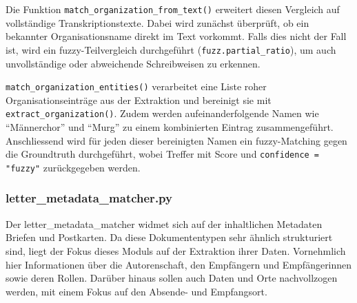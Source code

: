 \documentclass[12pt, a4paper, ngerman, bidi=default]{article}
\newcommand{\code}[1]{\colorbox{VeryLightGray}{\texttt{#1}}} %
\begin{document}
Die Funktion \code{match\_organization\_from\_text()} erweitert diesen Vergleich auf vollständige Transkriptionstexte. Dabei wird zunächst überprüft, ob ein bekannter Organisationsname direkt im Text vorkommt. Falls dies nicht der Fall ist, wird ein fuzzy-Teilvergleich durchgeführt (\code{fuzz.partial\_ratio}), um auch unvollständige oder abweichende Schreibweisen zu erkennen.

\code{match\_organization\_entities()} verarbeitet eine Liste roher Organisationseinträge aus der Extraktion und bereinigt sie mit \code{extract\_organization()}. Zudem werden aufeinanderfolgende Namen wie \enquote{Männerchor} und \enquote{Murg} zu einem kombinierten Eintrag zusammengeführt. Anschliessend wird für jeden dieser bereinigten Namen ein fuzzy-Matching gegen die Groundtruth durchgeführt, wobei Treffer mit Score und \code{confidence = "fuzzy"} zurückgegeben werden.

\subsubsection{letter\_metadata\_matcher.py}\label{subsection:letter_metadata_matcher}

Der letter\_metadata\_matcher widmet sich auf der inhaltlichen Metadaten Briefen und Postkarten. Da diese Dokumententypen sehr ähnlich strukturiert sind, liegt der Fokus dieses Moduls auf der Extraktion ihrer Daten. Vornehmlich hier Informationen über die Autorenschaft, den Empfängern und Empfängerinnen sowie deren Rollen. Darüber hinaus sollen auch Daten und Orte nachvollzogen werden, mit einem Fokus auf den Absende- und Empfangsort. 
\end{document}
